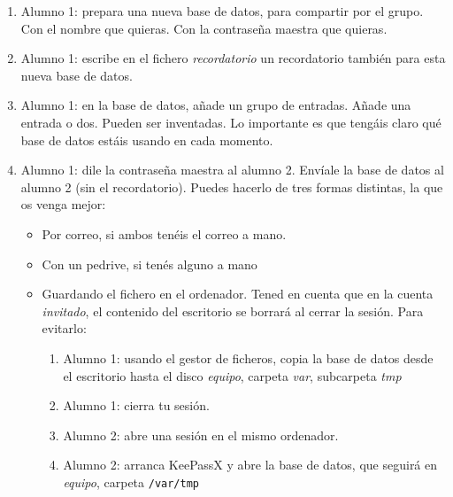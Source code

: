 \documentclass[a4paper,12pt]{article}
\begin{document}
\begin{enumerate}
    \item
Alumno 1: prepara una nueva base de datos, para compartir por el grupo. Con el nombre que quieras. 
Con la contraseña maestra que quieras.

    \item
Alumno 1: escribe en el fichero \emph{recordatorio} un recordatorio también para esta nueva
base de datos.

    \item
Alumno 1: en la base de datos, añade un grupo de entradas. Añade 
una entrada o dos. Pueden ser inventadas.
Lo importante es que tengáis claro qué base de datos estáis usando en cada momento.

    \item
Alumno 1: dile la contraseña maestra al alumno 2. Envíale la base de datos al alumno 2 (sin el recordatorio). Puedes hacerlo de tres formas distintas, la que 
os venga mejor:

\begin{itemize}
\item
 Por correo, si ambos tenéis el correo a mano.

\item
Con un pedrive, si tenés alguno a mano

\item

Guardando el fichero en el ordenador. Tened en cuenta que
en la cuenta \emph{invitado}, el contenido del escritorio se borrará al cerrar la sesión. 
Para evitarlo:

\begin{enumerate}
\item
Alumno 1: usando el gestor de ficheros, copia la base de datos desde el escritorio hasta el disco \emph{equipo}, carpeta \emph{var}, subcarpeta \emph{tmp}

\item
Alumno 1: cierra tu sesión.

\item
Alumno 2: abre una sesión en el mismo ordenador.

\item
Alumno 2: arranca KeePassX y abre la base de datos, que seguirá en \emph{equipo}, carpeta \verb|/var/tmp|

\end{enumerate}

\end{itemize}




    \end{enumerate}
\end{document}
